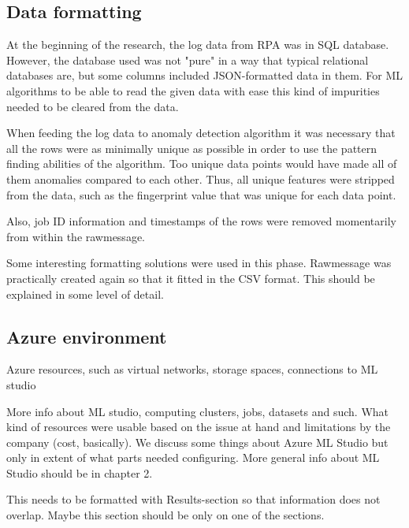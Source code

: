 \subsection{Data formatting}\label{subsec:meth-data-formatting}
At the beginning of the research,
the log data from RPA was in SQL database.
However,
the database used was not "pure"
in a way that typical relational databases are,
but some columns included JSON-formatted data in them.
For ML algorithms to be able to read the given data with ease
this kind of impurities needed to be cleared from the data.

When feeding the log data to anomaly detection algorithm
it was necessary that all the rows were
as minimally unique as possible
in order to use the pattern finding abilities of the algorithm.
Too unique data points would have made all of them anomalies
compared to each other.
Thus, all unique features were stripped from the data,
such as the fingerprint value
that was unique for each data point.
\begin{itcomment}
    Also,
    job ID information and timestamps of the rows
    were removed momentarily from within the rawmessage.
\end{itcomment}

\begin{itcomment}
    Some interesting formatting solutions were used in this phase.
    Rawmessage was practically created again
    so that it fitted in the CSV format.
    This should be explained in some level of detail.
\end{itcomment}




\subsection{Azure environment}\label{subsec:meth-azure-environment}

\begin{itcomment}
    Azure resources, such as virtual networks, storage spaces, connections to ML studio \etc

    More info about ML studio,
    computing clusters, jobs, datasets and such.
    What kind of resources were usable based on the issue at hand
    and limitations by the company (cost, basically).
    We discuss some things about Azure ML Studio
    but only in extent of what parts needed configuring.
    More general info about ML Studio should be in chapter 2.

    This needs to be formatted with Results-section
    so that information does not overlap.
    Maybe this section should be only on one of the sections.
\end{itcomment}

